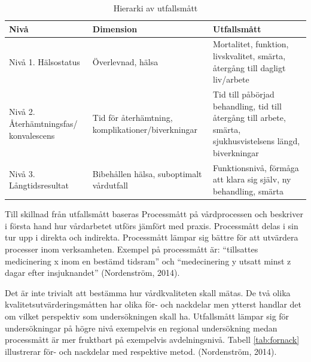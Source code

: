 \begin{table}[h]
\centering
\caption{Hierarki av utfallsmått}
\label{utfallsh}
\begin{tabular}{|p{3cm}|p{5cm}|p{5cm}|}
\hline
Nivå & Dimension & Utfallsmått \\ \hline
Nivå 1. \newline Hälsostatus & Överlevnad, hälsa & Mortalitet, funktion, livskvalitet, smärta, återgång till dagligt liv/arbete \\ \hline
Nivå 2. \newline Återhämtningsfas/ konvalescens & Tid för återhämtning, komplikationer/biverkningar & Tid till påbörjad behandling, tid till återgång till arbete, smärta, sjukhusvistelsens längd, biverkningar \\ \hline
Nivå 3. \newline Långtidsresultat & Bibehållen hälsa, suboptimalt vårdutfall & Funktionsnivå, förmåga att klara sig själv, ny behandling, smärta \\ \hline
\end{tabular}
\end{table}

Till skillnad från utfallsmått baseras Processmått  på vårdprocessen och beskriver i första hand hur vårdarbetet utförs jämfört med praxis. Processmått delas i sin tur upp i direkta och indirekta. Processmått lämpar sig bättre för att utvärdera processer inom verksamheten. Exempel på processmått är: “tillsattes medicinering x inom en bestämd tidsram” och “medecinering y utsatt minst z dagar efter insjuknandet” (Nordenström, 2014).
 
Det är inte trivialt att bestämma hur vårdkvaliteten skall mätas. De två olika kvalitetsutvärderingsmåtten har olika för- och nackdelar men ytterst handlar det om vilket perspektiv som undersökningen skall ha. Utfallsmått lämpar sig för undersökningar på högre nivå exempelvis en regional undersökning medan processmått är mer fruktbart på exempelvis avdelningsnivå. Tabell \ref{tab:fornack} illustrerar för- och nackdelar med respektive metod. (Nordenström, 2014).

